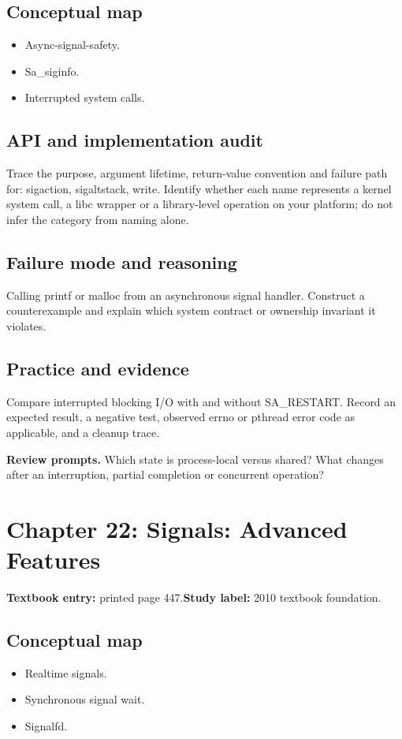 \documentclass[11pt,letterpaper,oneside]{report}
\begin{document}
\subsection{Conceptual map}
\begin{itemize}
\item Async-signal-safety.
\item Sa\_siginfo.
\item Interrupted system calls.
\end{itemize}
\subsection{API and implementation audit}
Trace the purpose, argument lifetime, return-value convention and failure path for: sigaction, sigaltstack, write. Identify whether each name represents a kernel system call, a libc wrapper or a library-level operation on your platform; do not infer the category from naming alone.

\subsection{Failure mode and reasoning}
Calling printf or malloc from an asynchronous signal handler. Construct a counterexample and explain which system contract or ownership invariant it violates.

\subsection{Practice and evidence}
Compare interrupted blocking I/O with and without SA\_RESTART. Record an expected result, a negative test, observed errno or pthread error code as applicable, and a cleanup trace.

\textbf{Review prompts.} Which state is process-local versus shared? What changes after an interruption, partial completion or concurrent operation?

\section{Chapter 22: Signals: Advanced Features}
\textbf{Textbook entry:} printed page 447.\quad \textbf{Study label:} 2010 textbook foundation.

\subsection{Conceptual map}
\begin{itemize}
\item Realtime signals.
\item Synchronous signal wait.
\item Signalfd.
\end{itemize}
\end{document}
